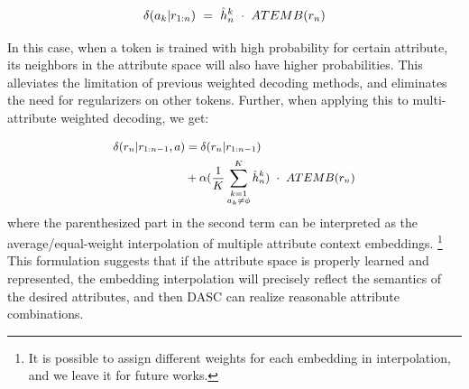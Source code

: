 \begin{equation}
    \small
    \delta(a_k|r_{1:n}) = \hat h^k_n \cdot ATEMB(r_n)
    \label{eqn:matching_for_logits}
\end{equation}

In this case, when a token is trained with high probability for 
certain attribute, its neighbors in the attribute space will also 
have higher probabilities. This alleviates the limitation of previous 
weighted decoding methods, and eliminates the need for regularizers on 
other tokens. Further, when applying this to multi-attribute weighted decoding, 
we get: 

\begin{equation}
    \small
    \begin{aligned}
        \delta(r_n|r_{1:n-1}, a) &= \delta(r_n|r_{1:n-1}) \\
                                 &+ \alpha (\frac{1}{K} \sum_{\substack{k=1\\a_k\ne \phi}}^{K} \hat h^k_n) \cdot ATEMB(r_n)
    \end{aligned}
    \label{eqn:dasc_logits}
\end{equation}
where the parenthesized part in the second term can be interpreted as the 
average/equal-weight interpolation of multiple attribute context embeddings.
\footnote{It is possible to assign different weights for each embedding in interpolation, and we leave it for future works.}
This formulation suggests that if the attribute space is properly learned and represented, the embedding interpolation will precisely reflect the semantics of the desired attributes, and then DASC can realize reasonable attribute combinations. 

